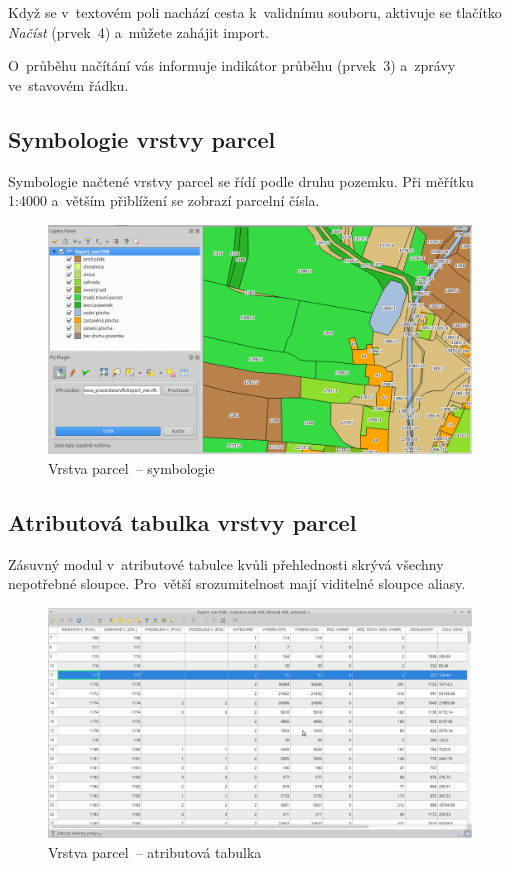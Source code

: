 Když se v~textovém poli nachází cesta k~validnímu  souboru, aktivuje se tlačítko \textit{Načíst} (prvek~4) a~můžete zahájit import.

O~průběhu načítání vás informuje indikátor průběhu (prvek~3) a~zprávy ve~stavovém řádku.

\subsection{Symbologie vrstvy parcel}
\label{manual_nacteni_symbologie}

Symbologie načtené vrstvy parcel se řídí podle druhu pozemku. Při měřítku 1:4000 a~větším přiblížení se zobrazí parcelní čísla.

	\begin{figure}[H]
		\centering
		\includegraphics[width=.9\textwidth]{./pictures/symbologie_par.png}
		\caption[Vrstva parcel~– symbologie]{Vrstva parcel~– symbologie}
		\label{fig:manual_symbologie_par}
 	\end{figure}

\subsection{Atributová tabulka vrstvy parcel}
\label{manual_nacteni_tabulka}

Zásuvný modul v~atributové tabulce kvůli přehlednosti skrývá všechny nepotřebné sloupce. Pro~větší srozumitelnost mají viditelné sloupce aliasy.

	\begin{figure}[H]
		\centering
		\includegraphics[width=.95\textwidth]{./pictures/nacteni-tabulka.png}
		\caption[Vrstva parcel~– atributová tabulka]{Vrstva parcel~– atributová tabulka}
		\label{fig:manual_tabulka_par}
 	\end{figure}

